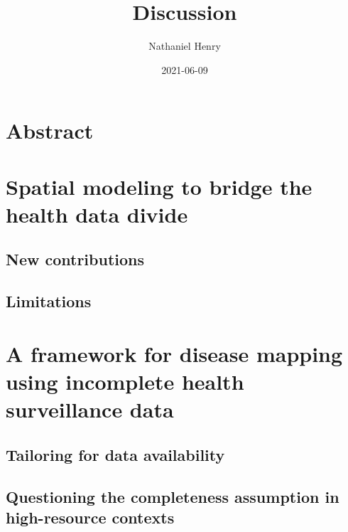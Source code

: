 \documentclass[
]{article}
\title{Discussion}
\author{Nathaniel Henry}
\date{2021-06-09}
\begin{document}
\maketitle

\hypertarget{abstract}{%
\section{Abstract}\label{abstract}}

\lipsum[1]

\hypertarget{spatial-modeling-to-bridge-the-health-data-divide}{%
\section{Spatial modeling to bridge the health data divide}\label{spatial-modeling-to-bridge-the-health-data-divide}}

\lipsum[2-10]

\hypertarget{new-contributions}{%
\subsection{New contributions}\label{new-contributions}}

\lipsum[11-13]

\hypertarget{limitations}{%
\subsection{Limitations}\label{limitations}}

\lipsum[14-15]

\hypertarget{a-framework-for-disease-mapping-using-incomplete-health-surveillance-data}{%
\section{A framework for disease mapping using incomplete health surveillance data}\label{a-framework-for-disease-mapping-using-incomplete-health-surveillance-data}}

\lipsum[1-6]

\hypertarget{tailoring-for-data-availability}{%
\subsection{Tailoring for data availability}\label{tailoring-for-data-availability}}

\lipsum[7-10]

\hypertarget{questioning-the-completeness-assumption-in-high-resource-contexts}{%
\subsection{Questioning the completeness assumption in high-resource contexts}\label{questioning-the-completeness-assumption-in-high-resource-contexts}}
\end{document}
